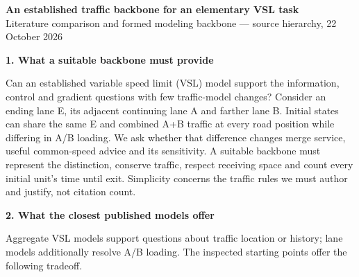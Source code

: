 \documentclass[10pt,a4paper]{article}
\newcommand{\head}[1]{\par\vspace{5pt}\noindent\textbf{#1}\par\nobreak\vspace{1pt}}
\begin{document}
\begin{center}
{\large\bfseries An established traffic backbone for an elementary VSL task}\\[3pt]
Literature comparison and formed modeling backbone --- source hierarchy, 22 October 2026
\end{center}
\vspace{-3pt}

\head{1. What a suitable backbone must provide}
Can an established variable speed limit (VSL) model support the information,
control and gradient questions with few traffic-model changes? Consider an
ending lane E, its adjacent continuing lane A and farther lane B. Initial
states can share the same E and combined A+B traffic at every road position
while differing in A/B loading. We ask whether that difference changes merge
service, useful common-speed advice and its sensitivity. A suitable backbone
must represent the distinction, conserve traffic, respect receiving space
and count every initial unit's time until exit. Simplicity concerns the
traffic rules we must author and justify, not citation count.

\head{2. What the closest published models offer}
Aggregate VSL models support questions about traffic location or history;
lane models additionally resolve A/B loading. The inspected starting points
offer the following tradeoff.
\end{document}
